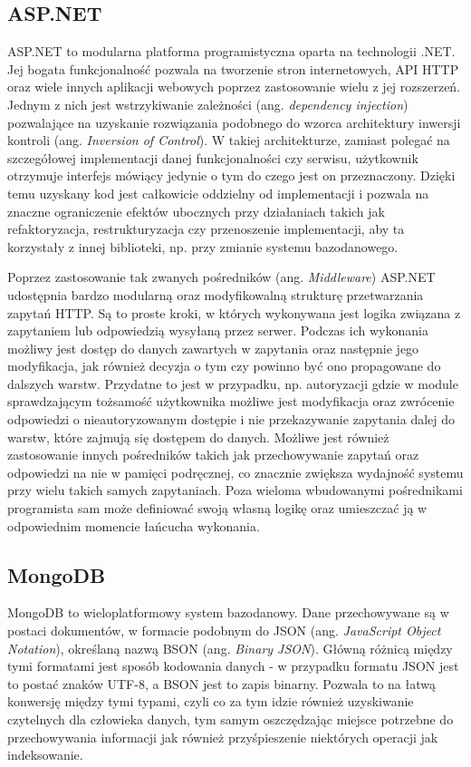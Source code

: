 \subsection*{ASP.NET}
ASP.NET\cite{aspnet} to modularna platforma programistyczna oparta na technologii .NET. 
Jej bogata funkcjonalność pozwala na tworzenie stron internetowych, API HTTP oraz 
wiele innych aplikacji webowych poprzez zastosowanie wielu z jej rozszerzeń.
Jednym z nich jest wstrzykiwanie zależności (ang. \textit{dependency injection})
pozwalające na uzyskanie rozwiązania podobnego do wzorca architektury inwersji
kontroli (ang. \textit{Inversion of Control}). W takiej architekturze, zamiast
polegać na szczegółowej implementacji danej funkcjonalności czy serwisu,
użytkownik otrzymuje interfejs mówiący jedynie o tym do czego jest on przeznaczony.
Dzięki temu uzyskany kod jest całkowicie oddzielny od implementacji i pozwala
na znaczne ograniczenie efektów ubocznych przy działaniach takich jak refaktoryzacja,
restrukturyzacja czy przenoszenie implementacji, aby ta korzystały z innej biblioteki, np.
przy zmianie systemu bazodanowego.

Poprzez zastosowanie tak zwanych pośredników (ang. \textit{Middleware}) ASP.NET udostępnia
bardzo modularną oraz modyfikowalną strukturę przetwarzania zapytań HTTP.
Są to proste kroki, w których wykonywana jest logika związana z zapytaniem lub odpowiedzią
wysyłaną przez serwer. Podczas ich wykonania możliwy jest dostęp do danych zawartych
w zapytania oraz następnie jego modyfikacja, jak również decyzja o tym czy powinno
być ono propagowane do dalszych warstw. Przydatne to jest w przypadku, np. autoryzacji
gdzie w module sprawdzającym tożsamość użytkownika możliwe jest modyfikacja oraz zwrócenie
odpowiedzi o nieautoryzowanym dostępie i nie przekazywanie zapytania dalej do warstw, które zajmują
się dostępem do danych. Możliwe jest również zastosowanie innych pośredników takich
jak przechowywanie zapytań oraz odpowiedzi na nie w pamięci podręcznej, co znacznie
zwiększa wydajność systemu przy wielu takich samych zapytaniach. Poza wieloma wbudowanymi
pośrednikami programista sam może definiować swoją własną logikę oraz umieszczać
ją w odpowiednim momencie łańcucha wykonania.

\subsection*{MongoDB}
MongoDB\cite{MongoDB} to wieloplatformowy system bazodanowy. Dane przechowywane są w postaci dokumentów,
w formacie podobnym do JSON (ang. \textit{JavaScript Object Notation}), określaną nazwą
BSON (ang. \textit{Binary JSON}). Główną różnicą między tymi formatami jest sposób kodowania
danych - w przypadku formatu JSON jest to postać znaków UTF-8, a BSON jest to zapis binarny.
Pozwala to na łatwą konwersję między tymi typami, czyli co za tym idzie również uzyskiwanie
czytelnych dla człowieka danych, tym samym oszczędzając miejsce potrzebne do przechowywania
informacji jak również przyśpieszenie niektórych operacji jak indeksowanie.

